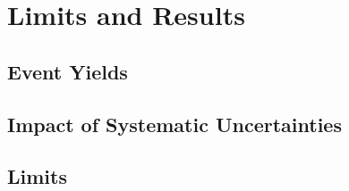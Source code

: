 %
%
%



\section{Limits and Results}
\subsection{Event Yields}
\subsection{Impact of Systematic Uncertainties}
\subsection{Limits}

\begin{comment}
begin{figure}[!hbt]
	\centering
	\begin{subfigure}[t]{0.46\textwidth}
		\texttt{[image: \\figpath/Chapter4/2015\_08\_01\_combinedSM\_KinMEBDT\_StatsOnly.pdf]}
		\label{fig:limits_stats_only}
	\end{subfigure}
	\begin{subfigure}[t]{0.46\textwidth}
		\texttt{[image: \\figpath/Chapter4/2015\_08\_01\_combinedSM\_KinMEBDT.pdf]}
		\label{fig:limits_with_sys}
	\end{subfigure}
	\caption{Expected 95\% upper confidence level on the Higgs signal strength (left) without including systematic uncertainties and (right) with systematic uncertainties included. The median combined limit is found to be 2.01 without systematics and 3.48 with them.}
	\label{fig:limits}
\end{figure}
\end{comment}